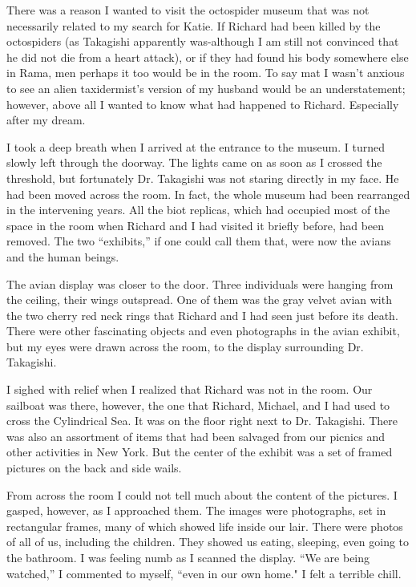 \documentclass[]{article}
\begin{document}
There was a reason I wanted to visit the octospider museum that was not necessarily related to my search for Katie.  If Richard had been killed by the octospiders (as Takagishi apparently was-although I am still not convinced that he did not die from a heart attack), or if they had found his body somewhere else in Rama, men perhaps it too would be in the room.  To say mat I wasn’t anxious to see an alien taxidermist’s version of my husband would be an understatement; however, above all I wanted to know what had happened to Richard.  Especially after my dream.

I took a deep breath when I arrived at the entrance to the museum.  I turned slowly left through the doorway.  The lights came on as soon as I crossed the threshold, but fortunately Dr.  Takagishi was not staring directly in my face.  He had been moved across the room.  In fact, the whole museum had been rearranged in the intervening years.  All the biot replicas, which had occupied most of the space in the room when Richard and I had visited it briefly before, had been removed.  The two “exhibits,” if one could call them that, were now the avians and the human beings.

The avian display was closer to the door.  Three individuals were hanging from the ceiling, their wings outspread.  One of them was the gray velvet avian with the two cherry red neck rings that Richard and I had seen just before its death.  There were other fascinating objects and even photographs in the avian exhibit, but my eyes were drawn across the room, to the display surrounding Dr.  Takagishi.

I sighed with relief when I realized that Richard was not in the room.  Our sailboat was there, however, the one that Richard, Michael, and I had used to cross the Cylindrical Sea.  It was on the floor right next to Dr.  Takagishi.  There was also an assortment of items that had been salvaged from our picnics and other activities in New York.  But the center of the exhibit was a set of framed pictures on the back and side wails.

From across the room I could not tell much about the content of the pictures.  I gasped, however, as I approached them.  The images were photographs, set in rectangular frames, many of which showed life inside our lair.  There were photos of all of us, including the children.  They showed us eating, sleeping, even going to the bathroom.  I was feeling numb as I scanned the display.  “We are being watched,” I commented to myself, “even in our own home."  I felt a terrible chill.
\end{document}
